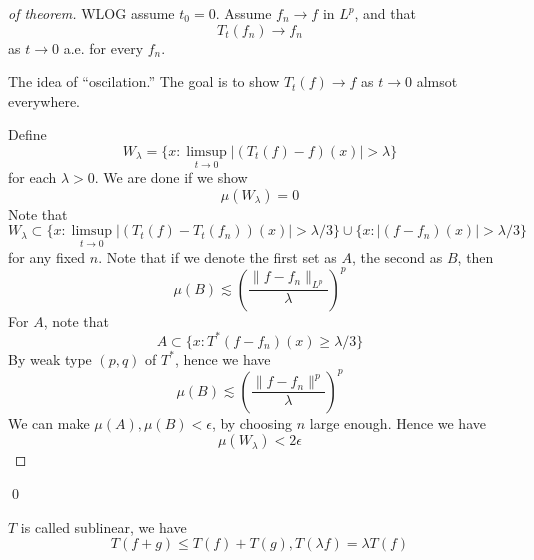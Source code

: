 \begin{proof}[of theorem]
    WLOG assume $t_0=0$. Assume $f_n\to f$ in $L^p$, and that
    \begin{equation*}
        T_t(f_n)\to f_n
    \end{equation*}
    as $t\to 0$ a.e. for every $f_n$.

    The idea of ``oscilation.'' The goal is to show $T_t(f)\to f$ as $t\to 0$ almsot everywhere.

    Define
    \begin{equation*}
        W_\lambda=\{x: \limsup_{t\to 0}|(T_t(f)-f)(x)|>\lambda \}
    \end{equation*}
    for each $\lambda>0$. We are done if we show 
    \begin{equation*}
        \mu(W_\lambda)=0
    \end{equation*}
    Note that 
    \begin{equation*}
        W_\lambda\subset\{x:\limsup_{t\to 0}|(T_t(f)-T_t(f_n))(x)|>\lambda/3\}\cup \{x: |(f-f_n)(x)|>\lambda/3\}
    \end{equation*}
    for any fixed $n$. Note that if we denote the first set as $A$, the second as $B$, then 
    \begin{equation*}
        \mu(B)\lesssim \left(\frac{\|f-f_n\|_{L^p}}{\lambda} \right)^p
    \end{equation*}
    For $A$, note that 
    \begin{equation*}
        A\subset \{x: T^*(f-f_n)(x)\geq\lambda/3\}
    \end{equation*}
    By weak type $(p,q)$ of $T^*$, hence we have
    \begin{equation*}
        \mu(B)\lesssim \left(\frac{\|f-f_n\|^p}{\lambda} \right)^p
    \end{equation*}
    We can make $\mu(A), \mu(B)<\epsilon$, by choosing $n$ large enough. Hence we have
    \begin{equation*}
        \mu(W_\lambda)<2\epsilon
    \end{equation*}
\end{proof}
\qed

\begin{definition}
    $T$ is called sublinear, we have 
    \begin{equation*}
        T(f+g)\leq T(f)+T(g), T(\lambda f)=\lambda T(f)
    \end{equation*}
\end{definition}

